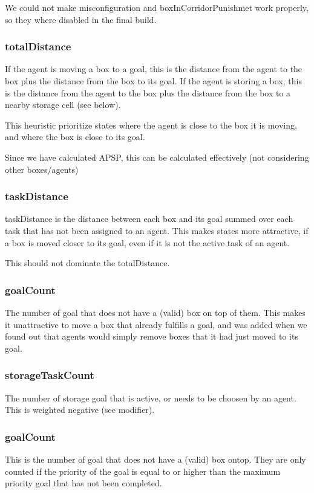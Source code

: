 \documentclass[letterpaper]{article}
\begin{document}
We could not make misconfiguration and boxInCorridorPunishmet
work properly, so they where disabled in the final build.

\subsubsection{totalDistance}
If the agent is moving a box to a goal, this is the distance from the agent
to the box plus the distance from the box to its goal. If the agent is storing
a box, this is the distance from the agent to the box plus the distance from the
box to a nearby storage cell (see below).

This heuristic prioritize states where the agent is close to the box it is moving,
and where the box is close to its goal.

Since we have calculated APSP, this can be calculated effectively (not considering other boxes/agents)\\

\subsubsection{taskDistance}
taskDistance is the distance between each box and its goal summed over each task
that has not been assigned to an agent. This makes states more attractive, if
a box is moved closer to its goal, even if it is not the active task of an agent.

This should not dominate the totalDistance.

\subsubsection{goalCount}
The number of goal that does not have a (valid) box on top of them. This makes it
unattractive to move a box that already fulfills a goal, and was added when we found
out that agents would simply remove boxes that it had just moved to its goal.

\subsubsection{storageTaskCount}
The number of storage goal that is active, or needs to be choosen by an agent.
This is weighted negative (see modifier).

\subsubsection{goalCount}
This is the number of goal that does not have a (valid) box ontop. They are only
counted if the priority of the goal is equal to or higher than the maximum priority
goal that has not been completed.
\end{document}
